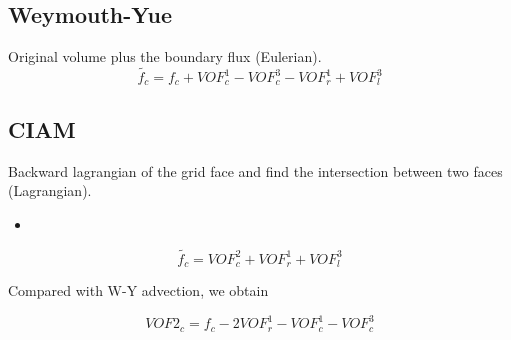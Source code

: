 \documentclass{article}
\begin{document}
\subsection{Weymouth-Yue}
Original volume plus the boundary flux (Eulerian).
\begin{equation}
  \label{eq:wy}
  \tilde{f_{c}} = f_{c} + VOF^{1}_{c} - VOF^{3}_{c} - VOF^{1}_{r} + VOF^{3}_{l}
\end{equation}

\subsection{CIAM}
Backward lagrangian of the grid face and find the intersection between
two faces (Lagrangian).

\begin{itemize}
  \item 
\end{itemize}

\begin{equation}
  \label{eq:CIAM}
  \tilde{f_{c}} = VOF^{2}_{c} + VOF^{1}_{r} + VOF^{3}_{l}
\end{equation}

Compared with W-Y advection, we obtain

\begin{equation}
  \label{eq:CIAM}
  VOF2_{c} = f_{c} - 2 VOF^{1}_{r} - VOF^{1}_{c} - VOF^{3}_{c}
\end{equation}
\end{document}
